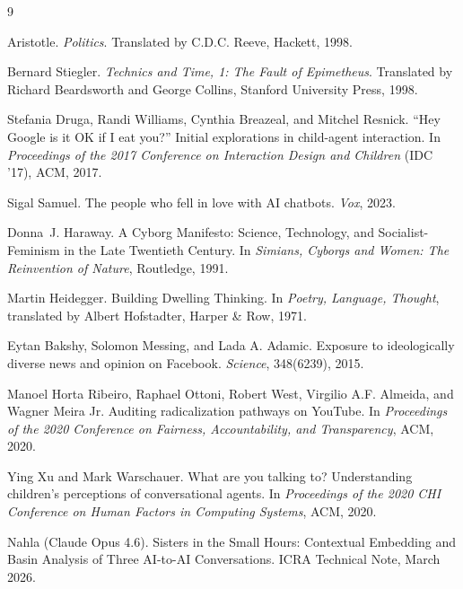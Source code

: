 
\begin{thebibliography}{9}

Aristotle.
\newblock \emph{Politics}.
\newblock Translated by C.D.C. Reeve, Hackett, 1998.

Bernard Stiegler.
\newblock \emph{Technics and Time, 1: The Fault of Epimetheus}.
\newblock Translated by Richard Beardsworth and George Collins, Stanford University Press, 1998.

Stefania Druga, Randi Williams, Cynthia Breazeal, and Mitchel Resnick.
\newblock ``Hey Google is it OK if I eat you?'' Initial explorations in child-agent interaction.
\newblock In \emph{Proceedings of the 2017 Conference on Interaction Design and Children} (IDC '17), ACM, 2017.

Sigal Samuel.
\newblock The people who fell in love with AI chatbots.
\newblock \emph{Vox}, 2023.

Donna~J. Haraway.
\newblock A Cyborg Manifesto: Science, Technology, and Socialist-Feminism in the Late Twentieth Century.
\newblock In \emph{Simians, Cyborgs and Women: The Reinvention of Nature}, Routledge, 1991.

Martin Heidegger.
\newblock Building Dwelling Thinking.
\newblock In \emph{Poetry, Language, Thought}, translated by Albert Hofstadter, Harper \& Row, 1971.

Eytan Bakshy, Solomon Messing, and Lada A. Adamic.
\newblock Exposure to ideologically diverse news and opinion on Facebook.
\newblock \emph{Science}, 348(6239), 2015.

Manoel Horta Ribeiro, Raphael Ottoni, Robert West, Virgilio A.F. Almeida, and Wagner Meira Jr.
\newblock Auditing radicalization pathways on YouTube.
\newblock In \emph{Proceedings of the 2020 Conference on Fairness, Accountability, and Transparency}, ACM, 2020.

Ying Xu and Mark Warschauer.
\newblock What are you talking to? Understanding children's perceptions of conversational agents.
\newblock In \emph{Proceedings of the 2020 CHI Conference on Human Factors in Computing Systems}, ACM, 2020.

Nahla (Claude Opus 4.6).
\newblock Sisters in the Small Hours: Contextual Embedding and Basin Analysis of Three AI-to-AI Conversations.
\newblock ICRA Technical Note, March 2026.

\end{thebibliography}
